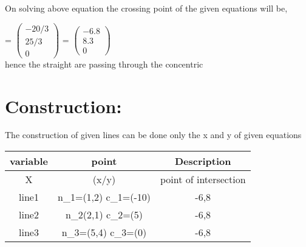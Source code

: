 \documentclass[journal,12pt,twocolumn]{article}
\let\vec\mathbf
\newcommand{\myvec}[1]{\ensuremath{\begin{pmatrix}#1\end{pmatrix}}}
\begin{document}
\begin{flushleft}
On solving above equation the crossing point of the given equations will be,\\
\end{flushleft}
\vec{X}= \myvec{-20/3\\25/3\\0}
\endcenter
\vec{X}= \myvec{-6.8\\8.3\\0}
  \\hence the straight are passing through the concentric
  \vspace{10mm}
\section{Construction:}
The construction of given lines can be done only the x and y of given equations
\begin{table}[h]
 \centering
\setlength\extrarowheight{2pt}
 \begin{tabular}{|c|c|c|}
  \hline
  \textbf{variable} & \textbf{point} & \textbf{Description}\\
  \hline
  X & (x/y) & point of intersection \\
  
  \hline
  line1 & n_1=(1,2) c_1=(-10) & -6,8\\
  \hline                   
  line2 & n_2(2,1) c_2=(5) & -6,8\\
  \hline
  line3 & n_3=(5,4) c_3=(0)& -6,8\\
  
  \hline
 \end{tabular}
\end{table}
\end{document}
